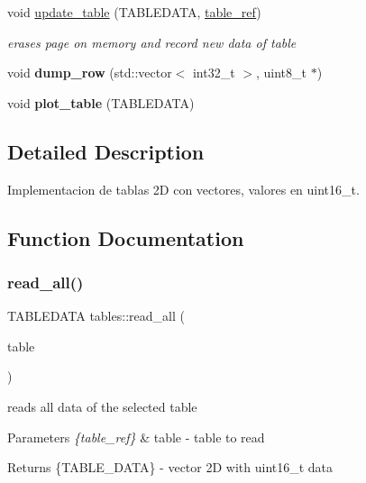 \begin{DoxyCompactItemize}
\mbox{\label{namespacetables_a3a6244d3e384337d006dfb252768558a}} 
void \hyperlink{namespacetables_a3a6244d3e384337d006dfb252768558a}{update\+\_\+table} (T\+A\+B\+L\+E\+D\+A\+TA, \hyperlink{structtable__ref}{table\+\_\+ref})
\begin{DoxyCompactList}\small\item\em erases page on memory and record new data of table \end{DoxyCompactList}\item 
\mbox{\label{namespacetables_a3d4eae2328222f2672364baad17b14eb}} 
void {\bfseries dump\+\_\+row} (std\+::vector$<$ int32\+\_\+t $>$, uint8\+\_\+t $\ast$)
\item 
\mbox{\label{namespacetables_adaa52c49224ec8a6aac276310d27e702}} 
void {\bfseries plot\+\_\+table} (T\+A\+B\+L\+E\+D\+A\+TA)
\end{DoxyCompactItemize}


\subsection{Detailed Description}
Implementacion de tablas 2D con vectores, valores en uint16\+\_\+t. 

\subsection{Function Documentation}
\mbox{\label{namespacetables_a8a1bab94b65aabe4f2b226cdac58b41f}} 
\subsubsection{\texorpdfstring{read\+\_\+all()}{read\_all()}}
{\footnotesize\ttfamily T\+A\+B\+L\+E\+D\+A\+TA tables\+::read\+\_\+all (\begin{DoxyParamCaption}\item[{\hyperlink{structtable__ref}{table\+\_\+ref}}]{table }\end{DoxyParamCaption})}



reads all data of the selected table 


\begin{DoxyParams}{Parameters}
{\em \{table\+\_\+ref\}} & table -\/ table to read \\
\hline
\end{DoxyParams}
\begin{DoxyReturn}{Returns}
\{T\+A\+B\+L\+E\+\_\+\+D\+A\+TA\} -\/ vector 2D with uint16\+\_\+t data 
\end{DoxyReturn}
